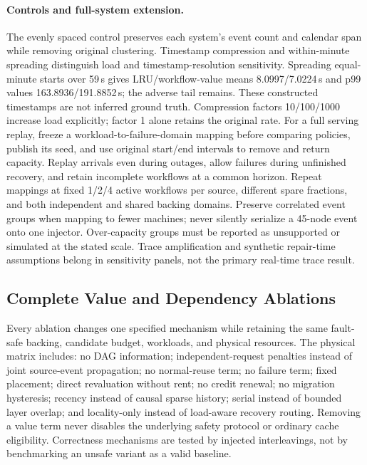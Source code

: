 \documentclass[sigplan,10pt,anonymous,nonacm]{acmart}
\begin{document}
\paragraph{Controls and full-system extension.}
The evenly spaced control preserves each system's event count and
calendar span while removing original clustering. Timestamp compression
and within-minute spreading distinguish load and timestamp-resolution
sensitivity. Spreading equal-minute starts over 59\,s gives LRU/workflow-value
means 8.0997/7.0224\,s and p99 values 163.8936/191.8852\,s; the adverse
tail remains. These constructed timestamps are not inferred ground truth.
Compression
factors 10/100/1000 increase load explicitly; factor 1 alone retains the
original rate. For a full serving replay, freeze a workload-to-failure-domain
mapping before comparing policies, publish its seed, and use original
start/end intervals to remove and return capacity. Replay arrivals even
during outages, allow failures during unfinished recovery, and retain
incomplete workflows at a common horizon. Repeat mappings at fixed
1/2/4 active workflows per source, different spare fractions, and both
independent and shared backing domains. Preserve correlated event groups
when mapping to fewer machines; never silently serialize a 45-node event
onto one injector. Over-capacity groups must be reported as unsupported
or simulated at the stated scale. Trace amplification and synthetic
repair-time assumptions belong in sensitivity panels, not the primary
real-time trace result.

\FloatBarrier
\subsection{Complete Value and Dependency Ablations}

Every ablation changes one specified mechanism while retaining the same
fault-safe backing, candidate budget, workloads, and physical resources.
The physical matrix includes: no DAG information; independent-request
penalties instead of joint source-event propagation; no normal-reuse
term; no failure term; fixed placement; direct revaluation without rent;
no credit renewal; no migration hysteresis; recency instead of causal
sparse history; serial instead of bounded layer overlap; and locality-only
instead of load-aware recovery routing. Removing a value term never
disables the underlying safety protocol or ordinary cache eligibility.
Correctness mechanisms are tested by injected interleavings, not by
benchmarking an unsafe variant as a valid baseline.
\end{document}
